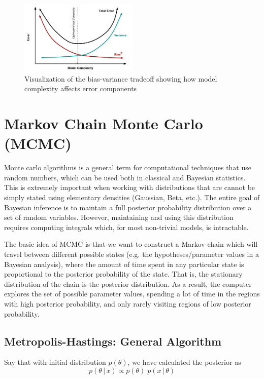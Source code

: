 \documentclass{article}
\begin{document}
  \begin{figure}[H]
    \centering
    \includegraphics[width=0.5\textwidth]{img/biasvariance.png}
    \caption{Visualization of the bias-variance tradeoff showing how model complexity affects error components}
  \end{figure}

\section{Markov Chain Monte Carlo (MCMC)}

  Monte carlo algorithms is a general term for computational techniques that use random numbers, which can be used both in classical and Bayesian statistics. This is extremely important when working with distributions that are cannot be simply stated using elementary densities (Gaussian, Beta, etc.). The entire goal of Bayesian inference is to maintain a full posterior probability distribution over a set of random variables. However, maintaining and using this distribution requires computing integrals which, for most non-trivial models, is intractable.

  The basic idea of MCMC is that we want to construct a Markov chain which will travel between different possible states (e.g. the hypotheses/parameter values in a Bayesian analysis), where the amount of time spent in any particular state is proportional to the posterior probability of the state. That is, the stationary distribution of the chain is the posterior distribution. As a result, the computer explores the set of possible parameter values, spending a lot of time in the regions with high posterior probability, and only rarely visiting regions of low posterior probability.

\subsection{Metropolis-Hastings: General Algorithm}

  Say that with initial distribution $p(\theta)$, we have calculated the posterior as
  \begin{equation}
    p(\theta\,|\,x) \propto p(\theta) \; p(x\,|\,\theta)
  \end{equation}
\end{document}
